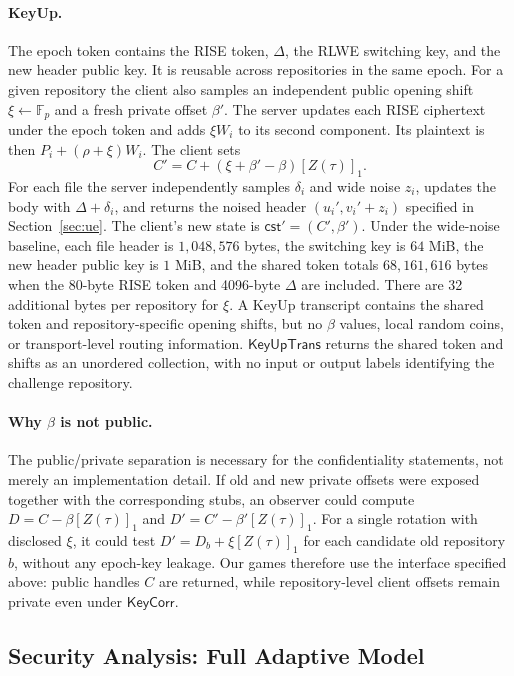\paragraph{KeyUp.}
The epoch token contains the RISE token, $\Delta$, the RLWE switching key, and the new header public key. It is reusable across repositories in the same epoch. For a given repository the client also samples an independent public opening shift $\xi\gets\mathbb F_p$ and a fresh private offset $\beta'$. The server updates each RISE ciphertext under the epoch token and adds $\xi W_i$ to its second component. Its plaintext is then $P_i+(\rho+\xi)W_i$. The client sets
\[
 C'=C+(\xi+\beta'-\beta)[Z(\tau)]_1 .
\]
For each file the server independently samples $\delta_i$ and wide noise $z_i$, updates the body with $\Delta+\delta_i$, and returns the noised header $(u_i',v_i'+z_i)$ specified in Section~\ref{sec:ue}. The client's new state is $\mathsf{cst}'=(C',\beta')$. Under the wide-noise baseline, each file header is $1{,}048{,}576$ bytes, the switching key is $64$ MiB, the new header public key is $1$ MiB, and the shared token totals $68{,}161{,}616$ bytes when the 80-byte RISE token and 4096-byte $\Delta$ are included. There are 32 additional bytes per repository for $\xi$. A KeyUp transcript contains the shared token and repository-specific opening shifts, but no $\beta$ values, local random coins, or transport-level routing information. $\mathsf{KeyUpTrans}$ returns the shared token and shifts as an unordered collection, with no input or output labels identifying the challenge repository.

\paragraph{Why $\beta$ is not public.}
The public/private separation is necessary for the confidentiality statements, not merely an implementation detail. If old and new private offsets were exposed together with the corresponding stubs, an observer could compute $D=C-\beta[Z(\tau)]_1$ and $D'=C'-\beta'[Z(\tau)]_1$. For a single rotation with disclosed $\xi$, it could test $D'=D_b+\xi[Z(\tau)]_1$ for each candidate old repository $b$, without any epoch-key leakage. Our games therefore use the interface specified above: public handles $C$ are returned, while repository-level client offsets remain private even under $\mathsf{KeyCorr}$.

\subsection{Security Analysis: Full Adaptive Model}

